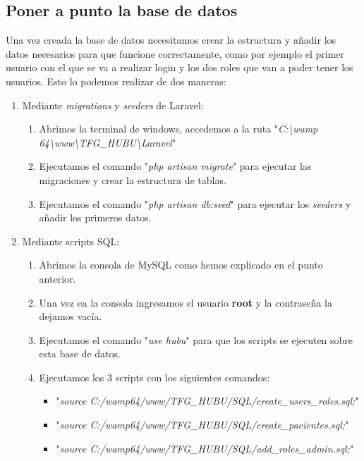 \subsection{Poner a punto la base de datos}

Una vez creada la base de datos necesitamos crear la estructura y añadir los datos necesarios para que funcione correctamente, como por ejemplo el primer usuario con el que se va a realizar login y los dos roles que van a poder tener los usuarios. Esto lo podemos realizar de dos maneras:

\begin{enumerate}
    \item Mediante \textit{migrations} y \textit{seeders} de Laravel:
    \begin{enumerate}
        \item Abrimos la terminal de windows, accedemos a la ruta "\textit{C:\textbackslash{}wamp\\64\textbackslash{}www\textbackslash{}TFG\_HUBU\textbackslash{}Laravel}"
        \item Ejecutamos el comando "\textit{php artisan migrate}" para ejecutar las migraciones y crear la estructura de tablas.
        \item Ejecutamos el comando "\textit{php artisan db:seed}" para ejecutar los \textit{seeders} y añadir los primeros datos.
    \end{enumerate}
    \item Mediante scripts SQL:
    \begin{enumerate}
        \item Abrimos la consola de MySQL como hemos explicado en el punto anterior.
        \item Una vez en la consola ingresamos el usuario \textbf{root} y la contraseña la dejamos vacía.
        \item Ejecutamos el comando "\textit{use hubu}"{} para que los scripts se ejecuten sobre esta base de datos.
        \item Ejecutamos los 3 scripts con los siguientes comandos:
        \begin{itemize}
            \item "\textit{source C:/wamp64/www/TFG\_HUBU/SQL/create\_users\_roles.sql;}"
            \item "\textit{source C:/wamp64/www/TFG\_HUBU/SQL/create\_pacientes.sql;}"
            \item "\textit{source C:/wamp64/www/TFG\_HUBU/SQL/add\_roles\_admin.sql;}"
        \end{itemize}
    \end{enumerate}
\end{enumerate}

